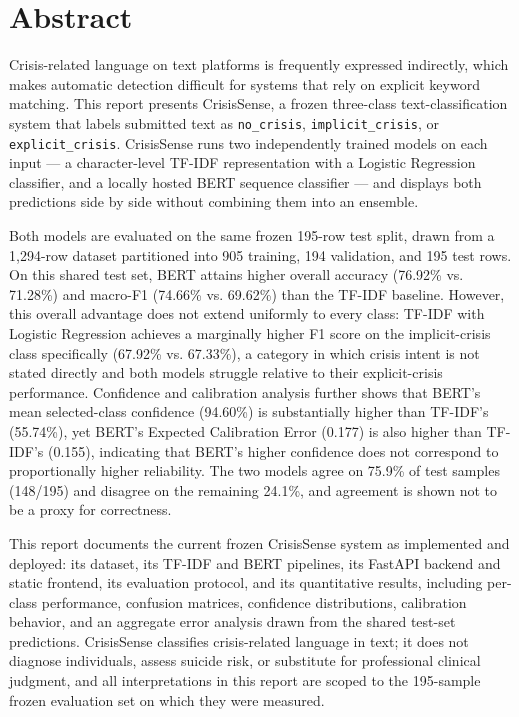 \chapter*{Abstract}

Crisis-related language on text platforms is frequently expressed indirectly, which makes automatic detection difficult for systems that rely on explicit keyword matching. This report presents CrisisSense, a frozen three-class text-classification system that labels submitted text as \texttt{no\_crisis}, \texttt{implicit\_crisis}, or \texttt{explicit\_crisis}. CrisisSense runs two independently trained models on each input --- a character-level TF-IDF representation with a Logistic Regression classifier, and a locally hosted BERT sequence classifier --- and displays both predictions side by side without combining them into an ensemble.

Both models are evaluated on the same frozen 195-row test split, drawn from a 1{,}294-row dataset partitioned into 905 training, 194 validation, and 195 test rows. On this shared test set, BERT attains higher overall accuracy (76.92\% vs. 71.28\%) and macro-F1 (74.66\% vs. 69.62\%) than the TF-IDF baseline. However, this overall advantage does not extend uniformly to every class: TF-IDF with Logistic Regression achieves a marginally higher F1 score on the implicit-crisis class specifically (67.92\% vs. 67.33\%), a category in which crisis intent is not stated directly and both models struggle relative to their explicit-crisis performance. Confidence and calibration analysis further shows that BERT's mean selected-class confidence (94.60\%) is substantially higher than TF-IDF's (55.74\%), yet BERT's Expected Calibration Error (0.177) is also higher than TF-IDF's (0.155), indicating that BERT's higher confidence does not correspond to proportionally higher reliability. The two models agree on 75.9\% of test samples (148/195) and disagree on the remaining 24.1\%, and agreement is shown not to be a proxy for correctness.

This report documents the current frozen CrisisSense system as implemented and deployed: its dataset, its TF-IDF and BERT pipelines, its FastAPI backend and static frontend, its evaluation protocol, and its quantitative results, including per-class performance, confusion matrices, confidence distributions, calibration behavior, and an aggregate error analysis drawn from the shared test-set predictions. CrisisSense classifies crisis-related language in text; it does not diagnose individuals, assess suicide risk, or substitute for professional clinical judgment, and all interpretations in this report are scoped to the 195-sample frozen evaluation set on which they were measured.
